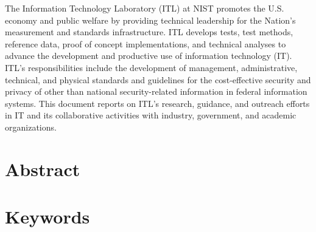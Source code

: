 The Information Technology Laboratory (ITL) at NIST promotes the
U.S. economy and public welfare by providing technical leadership for
the Nation’s measurement and standards infrastructure. ITL develops
tests, test methods, reference data, proof of concept implementations,
and technical analyses to advance the development and productive use
of information technology (IT). ITL’s responsibilities include the
development of management, administrative, technical, and physical
standards and guidelines for the cost-effective security and privacy
of other than national security-related information in federal
information systems. This document reports on ITL’s research,
guidance, and outreach efforts in IT and its collaborative activities
with industry, government, and academic organizations.




\newpage

\section*{\hfil \hspace{4cm} Abstract \hfil}
\ABSTRACT

\section*{\hfil  \hspace{4cm} Keywords \hfil}
\KEYWORDS

\newpage



\newpage

%  
  



\newpage

\tableofcontents

\listoffigures

\listoftables

\listoflistings
 
